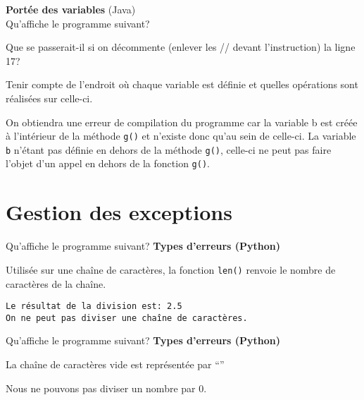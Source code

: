  \begin{Exercice}[10 minutes] \textbf{Portée des variables} (Java) \\
    Qu'affiche le programme suivant?
    
    Que se passerait-il si on décommente (enlever les // devant l'instruction) la ligne 17?

    \begin{conseil}
        Tenir compte de l’endroit où chaque variable est définie et quelles opérations sont réalisées sur celle-ci.
    \end{conseil}

    \begin{solution}
        On obtiendra une erreur de compilation du programme car la variable b est créée à l’intérieur de la méthode \lstinline{g()} et n’existe donc qu’au sein de celle-ci. La variable \lstinline{b} n’étant pas définie en dehors de la méthode \lstinline{g()}, celle-ci ne peut pas faire l’objet d’un appel en dehors de la fonction \lstinline{g()}.
    \end{solution}
    

 \end{Exercice}

\section{Gestion des exceptions}

\begin{Exercice}[5 minutes] Qu'affiche le programme suivant? \textbf{Types d'erreurs (Python)}\\
      
     \begin{conseil}
        Utilisée sur une chaîne de caractères, la fonction \lstinline{len()} renvoie le nombre de caractères de la chaîne. 
    \end{conseil}
     \begin{solution}
        \lstinline{Le résultat de la division est: 2.5}\\
        \lstinline{On ne peut pas diviser une chaîne de caractères.}
     \end{solution}   
 \end{Exercice}

\begin{Exercice}[5 minutes] Qu'affiche le programme suivant? \textbf{Types d'erreurs (Python)}\\
    
    
     \begin{conseil}
         La chaîne de caractères vide est représentée par ``'' 
    \end{conseil}
     \begin{solution}
        Nous ne pouvons pas diviser un nombre par 0.
     \end{solution}   
 \end{Exercice}


